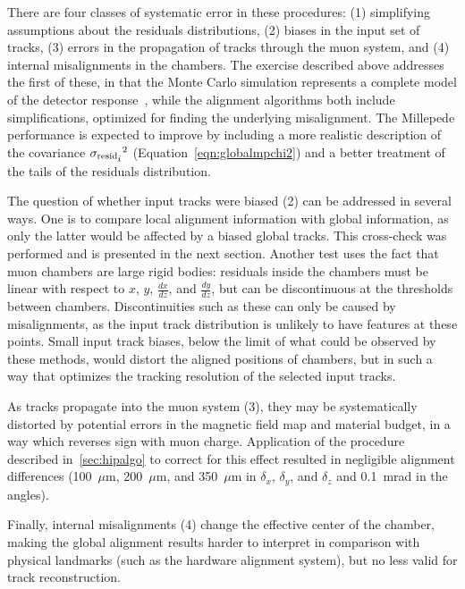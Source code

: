 There are four classes of systematic error in these procedures:
(1) simplifying assumptions about the residuals distributions,
(2) biases in the input set of tracks,
(3) errors in the propagation of tracks through the muon system, and
(4) internal misalignments in the chambers.
The exercise described above addresses the first of these, in that the
Monte Carlo simulation represents a complete model of the detector
response~\cite{ref:dtlocalreco}, while the alignment algorithms both
include simplifications, optimized for finding the underlying
misalignment.  The Millepede performance is expected to improve by
including a more realistic description of the covariance
${\sigma_{\mbox{\scriptsize resid}_{\mbox{\scriptsize
$i$}}}}^2$ (Equation~\ref{eqn:globalmpchi2}) and a better
treatment of the tails of the residuals distribution.

The question of whether input tracks were biased (2) can be addressed in several ways.
One is to compare local alignment information with global information,
as only the latter would be affected by a biased global tracks.  This
cross-check was performed and is presented in the next section.
Another test uses the fact that muon chambers are large rigid bodies:
residuals inside the chambers must be linear with respect to $x$, $y$,
$\tfrac{dx}{dz}$, and $\tfrac{dy}{dz}$, but can be discontinuous at
the thresholds between chambers.  Discontinuities such as these can
only be caused by misalignments, as the input track distribution is
unlikely to have features at these points.  Small input track biases, below
the limit of what could be observed by these methods, would distort
the aligned positions of chambers, but in such a way that optimizes
the tracking resolution of the selected input tracks.

As tracks propagate into the muon system (3), they may be systematically
distorted by potential errors in the magnetic field map and material
budget, in a way which reverses sign with muon charge.  Application of
the procedure described in~\ref{sec:hipalgo} to correct for this
effect resulted in negligible alignment differences (100~$\mu$m,
200~$\mu$m, and 350~$\mu$m
in $\delta_x$, $\delta_y$, and $\delta_z$ and 0.1~mrad in the angles).

Finally, internal misalignments (4) change the effective center of the
chamber, making the global alignment results harder to interpret in
comparison with physical landmarks (such as the hardware alignment
system), but no less valid for track reconstruction.


